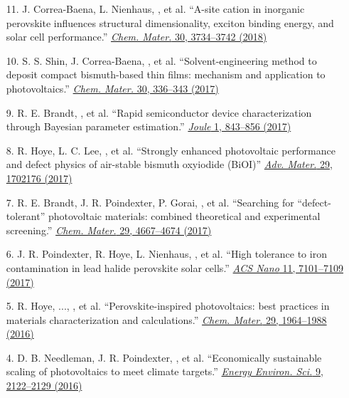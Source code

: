 \begin{enumerate}
        \item[11.] J. Correa-Baena, L. Nienhaus, \myname, et al. ``A-site cation in inorganic  perovskite influences structural dimensionality, exciton binding energy, and solar cell performance.'' \href{https://pubs.acs.org/doi/10.1021/acs.chemmater.8b00676}{\textit{Chem. Mater.} 30, 3734--3742 (2018)}

        \item[10.] S. S. Shin, J. Correa-Baena, \myname, et al. ``Solvent-engineering method to deposit compact bismuth-based thin films: mechanism and application to photovoltaics.'' \href{https://pubs.acs.org/doi/10.1021/acs.chemmater.7b03227}{\textit{Chem. Mater.} 30, 336--343 (2017)}

        \item[9.] R. E. Brandt, \myname, et al. ``Rapid semiconductor device characterization through Bayesian parameter estimation.'' \href{https://www.sciencedirect.com/science/article/pii/S254243511730096X?via\%3Dihub}{\textit{Joule} 1, 843--856 (2017)}

        \item[8.] R. Hoye, L. C. Lee, \myname, et al. ``Strongly enhanced photovoltaic performance and defect physics of air-stable bismuth oxyiodide (BiOI)'' \href{https://onlinelibrary.wiley.com/doi/full/10.1002/adma.201702176}{\textit{Adv. Mater.} 29, 1702176 (2017)}        

        \item[7.] R. E. Brandt, J. R. Poindexter, P. Gorai, \myname, et al. ``Searching for “defect-tolerant” photovoltaic materials: combined theoretical and experimental screening.'' \href{https://pubs.acs.org/doi/10.1021/acs.chemmater.6b05496}{\textit{Chem. Mater.} 29, 4667--4674 (2017)}

        \item[6.] J. R. Poindexter, R. Hoye, L. Nienhaus, \myname, et al. ``High tolerance to iron contamination in lead halide perovskite solar cells.'' \href{https://pubs.acs.org/doi/10.1021/acsnano.7b02734}{\textit{ACS Nano} 11, 7101--7109 (2017)}

        \item[5.] R. Hoye, ..., \myname, et al. ``Perovskite-inspired photovoltaics: best practices in materials characterization and calculations.'' \href{https://pubs.acs.org/doi/10.1021/acs.chemmater.6b03852}{\textit{Chem. Mater.} 29, 1964--1988 (2016)}

        \item[4.] D. B. Needleman, J. R. Poindexter, \myname, et al. ``Economically sustainable scaling of photovoltaics to meet climate targets.'' \href{https://pubs.rsc.org/en/content/articlelanding/2016/EE/C6EE00484A}{\textit{Energy Environ. Sci.} 9, 2122--2129 (2016)}


\end{enumerate}
